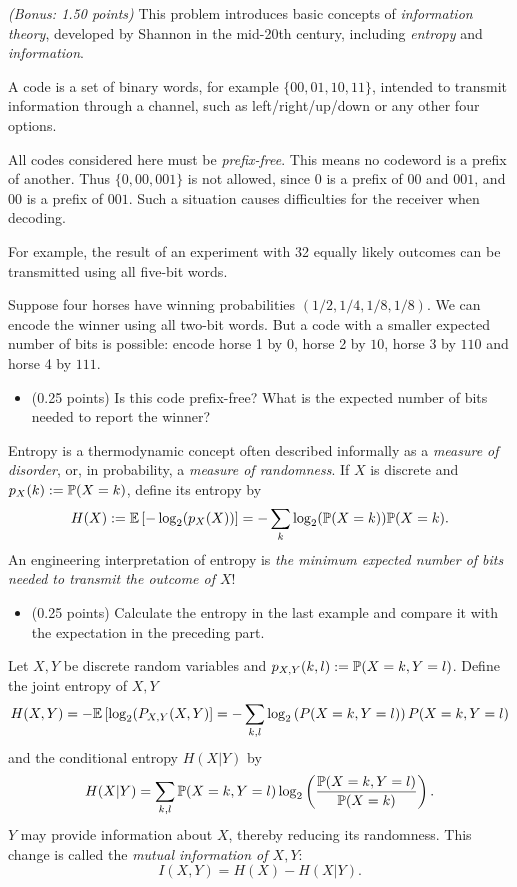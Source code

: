 \documentclass[a4paper]{report}
\begin{document}
\begin{problem}\textit{(Bonus: 1.50 points)}
This problem introduces basic concepts of \emph{information theory}, developed by Shannon
in the mid-20th century, including \emph{entropy} and \emph{information}.

A code is a set of binary words,
for example $\{00,01,10,11\}$, intended
to transmit information through a channel, such as
left/right/up/down or any other four options.

All codes considered here must be \emph{prefix-free}.
This means no codeword is a prefix of another. Thus $\{0,00,001\}$ is not allowed, since $0$
is a prefix of $00$ and $001$, and $00$
is a prefix of $001$. Such a situation causes difficulties
for the receiver when decoding.


For example, the result of an experiment with 32 equally likely outcomes can be transmitted using all five-bit words.

Suppose four horses have winning probabilities $(1/2,1/4,1/8,1/8)$. We can encode the winner using
all two-bit words. But a code with a smaller expected number of bits is possible: encode horse 1 by $0$, horse 2 by $10$, horse 3 by $110$ and horse 4 by $111$.
\begin{itemize}
    \item (0.25 points) Is this code prefix-free? What is the expected number of bits needed to report the winner?

\end{itemize}



Entropy is a thermodynamic concept often described informally as a \emph{measure of disorder}, or, in probability, a \emph{measure of randomness}. If $X$ is discrete and $p_X(k):=\P(X=k)$, define its entropy by
\[
H(X) := \Ebb{-\log_2(p_X(X))} = - \sum_k \log_2(\P(X = k))\P(X=k).
\]
An engineering interpretation of entropy is \textit{the minimum expected number of bits needed to transmit the outcome of $X$}!

\begin{itemize}
    \item (0.25 points) Calculate the entropy in the last example and compare it with the expectation in the preceding part.
\end{itemize}

Let $X,Y$ be discrete random variables and
$p_{X,Y}(k,l):=\P(X=k,Y=l)$. Define
the joint entropy of $X,Y$
\[
H(X,Y) = - \Ebb{\log_2 ( P_{X,Y}(X,Y)} =  -\sum_{k,l} \log_2 \lbrb{P(X= k , Y=l)}P(X= k , Y=l)
\]
and the conditional entropy $H(X|Y)$ by
\[
H(X|Y) = \sum_{k,l} \P(X=k,Y= l) \log_2 \lbrb{\frac{\P(X=k,Y=l)}{\P(X=k)}}.
\]
$Y$ may provide information about $X$, thereby reducing its randomness. This change is called the \emph{mutual information of $X,Y$}:
\[
I(X,Y) = H(X) - H(X|Y).
\]


\end{problem}
\end{document}
